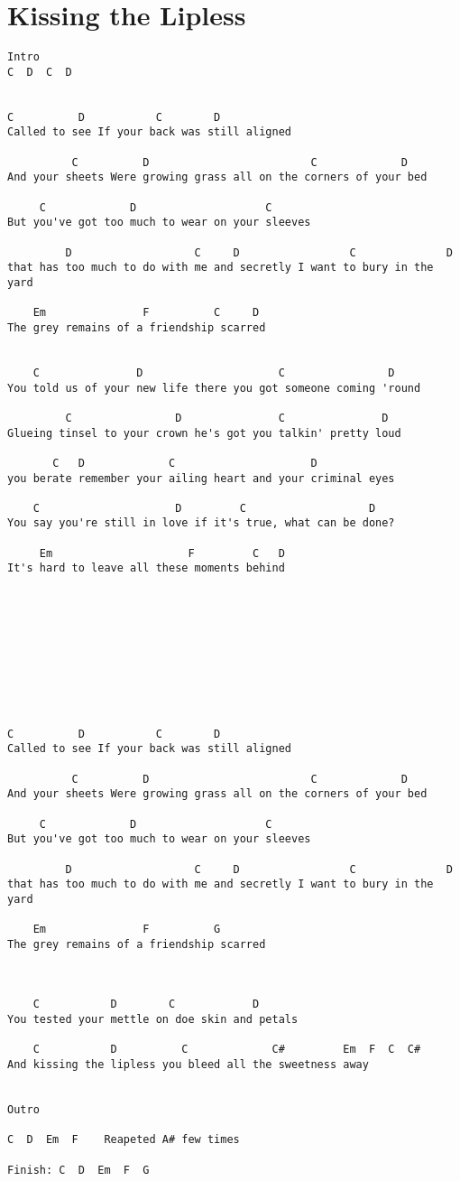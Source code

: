 \documentclass[leqno]{memoir}
\begin{document}
\chapter{Kissing the Lipless}
\begin{verbatim}
Intro
C  D  C  D


C          D           C        D
Called to see If your back was still aligned

          C          D                         C             D 
And your sheets Were growing grass all on the corners of your bed

     C             D                    C
But you've got too much to wear on your sleeves 

         D                   C     D                 C              D
that has too much to do with me and secretly I want to bury in the yard

    Em               F          C     D
The grey remains of a friendship scarred


    C               D                     C                D
You told us of your new life there you got someone coming 'round

         C                D               C               D
Glueing tinsel to your crown he's got you talkin' pretty loud

       C   D             C                     D
you berate remember your ailing heart and your criminal eyes

    C                     D         C                   D
You say you're still in love if it's true, what can be done?

     Em                     F         C   D
It's hard to leave all these moments behind










C          D           C        D
Called to see If your back was still aligned

          C          D                         C             D 
And your sheets Were growing grass all on the corners of your bed

     C             D                    C
But you've got too much to wear on your sleeves 

         D                   C     D                 C              D
that has too much to do with me and secretly I want to bury in the yard

    Em               F          G
The grey remains of a friendship scarred



    C           D        C            D
You tested your mettle on doe skin and petals

    C           D          C             C#         Em  F  C  C#
And kissing the lipless you bleed all the sweetness away


Outro

C  D  Em  F    Reapeted A# few times

Finish: C  D  Em  F  G
\end{verbatim}
\newpage
\end{document}
